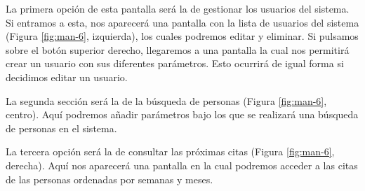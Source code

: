 La primera opción de esta pantalla será la de gestionar los usuarios del sistema. Si entramos a esta, nos aparecerá una pantalla con la lista de usuarios del sistema (Figura \ref{fig:man-6}, izquierda), los cuales podremos editar y eliminar. Si pulsamos sobre el botón superior derecho, llegaremos a una pantalla la cual nos permitirá crear un usuario con sus diferentes parámetros. Esto ocurrirá de igual forma si decidimos editar un usuario.

La segunda sección será la de la búsqueda de personas (Figura \ref{fig:man-6}, centro). Aquí podremos añadir parámetros bajo los que se realizará una búsqueda de personas en el sistema.

La tercera opción será la de consultar las próximas citas (Figura \ref{fig:man-6}, derecha). Aquí nos aparecerá una pantalla en la cual podremos acceder a las citas de las personas ordenadas por semanas y meses.

